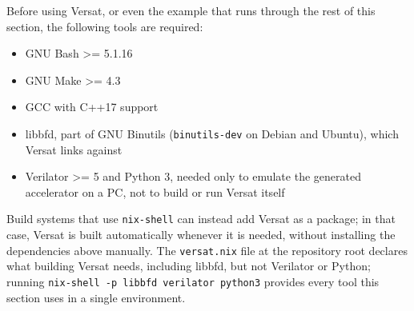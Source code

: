 %

Before using Versat, or even the example that runs through the rest of this section, the following tools are required:

\begin{itemize}
  \itemsep-0.5em
  \item GNU Bash >= 5.1.16
  \item GNU Make >= 4.3
  \item GCC with C++17 support
  \item libbfd, part of GNU Binutils (\texttt{binutils-dev} on Debian and Ubuntu), which Versat links against
  \item Verilator >= 5 and Python 3, needed only to emulate the generated accelerator on a PC, not to build or run Versat itself
\end{itemize}

Build systems that use \texttt{nix-shell} can instead add Versat as a package; in that case, Versat is built automatically whenever it is needed, without installing the dependencies above manually. The \texttt{versat.nix} file at the repository root declares what building Versat needs, including libbfd, but not Verilator or Python; running \texttt{nix-shell -p libbfd verilator python3} provides every tool this section uses in a single environment.

